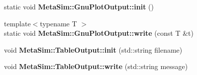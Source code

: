 \begin{DoxyCompactItemize}
\item 
static void {\bfseries Meta\+Sim\+::\+Gnu\+Plot\+Output\+::init} ()\hypertarget{group__metasim__stat_ga44313f3eb2a5e3fc92334c6cc7a0282c}{}\label{group__metasim__stat_ga44313f3eb2a5e3fc92334c6cc7a0282c}

\item 
{\footnotesize template$<$typename T $>$ }\\static void {\bfseries Meta\+Sim\+::\+Gnu\+Plot\+Output\+::write} (const T \&t)\hypertarget{group__metasim__stat_gac04806bf4bfd04d0d19de6ac33255008}{}\label{group__metasim__stat_gac04806bf4bfd04d0d19de6ac33255008}

\item 
void {\bfseries Meta\+Sim\+::\+Table\+Output\+::init} (std\+::string filename)\hypertarget{group__metasim__stat_ga5f211100da60ecfc5440653e720545fb}{}\label{group__metasim__stat_ga5f211100da60ecfc5440653e720545fb}

\item 
void {\bfseries Meta\+Sim\+::\+Table\+Output\+::write} (std\+::string message)\hypertarget{group__metasim__stat_ga997f322c6765984e5704baa6282b0685}{}\label{group__metasim__stat_ga997f322c6765984e5704baa6282b0685}

\end{DoxyCompactItemize}
